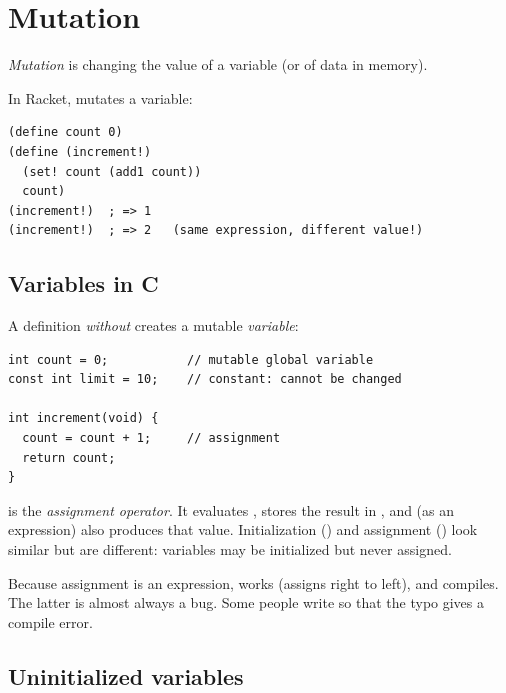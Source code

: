 \section{Mutation}

\begin{definition}
\emph{Mutation} is changing the value of a variable (or of data in memory).
\end{definition}

In Racket,  mutates a variable:
\begin{lstlisting}[style=racket]
(define count 0)
(define (increment!)
  (set! count (add1 count))
  count)
(increment!)  ; => 1
(increment!)  ; => 2   (same expression, different value!)
\end{lstlisting}

\subsection{Variables in C}

A definition \emph{without}  creates a mutable \emph{variable}:
\begin{lstlisting}[style=c]
int count = 0;           // mutable global variable
const int limit = 10;    // constant: cannot be changed

int increment(void) {
  count = count + 1;     // assignment
  return count;
}
\end{lstlisting}

\begin{important}[Assignment]
 is the \emph{assignment operator}. It evaluates , stores the result in
, and (as an expression) also produces that value. Initialization ()
and assignment () look similar but are different:  variables may be
initialized but never assigned.
\end{important}

\begin{aside}
Because assignment is an expression,  works (assigns right to left), and
 compiles. The latter is almost always a bug. Some people write
 so that the typo  gives a compile error.
\end{aside}

\subsection{Uninitialized variables}

